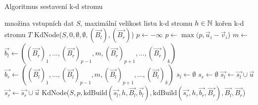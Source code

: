 \begin{algorithm}[ht!]
  \caption{Algoritmus sestavení k-d stromu}
  \label{algo:kd-tree-build}
  \begin{algorithmic}
    \Require množina vstupních dat $S$, maximální velikost listu k-d stromu $h \in \mathbb{N}$
    \Ensure kořen k-d stromu $T$
      \State \Return {}
    \EndProcedure
        \State \Return KdNode($S, 0, \emptyset, \emptyset, (\vec{B_l}), (\vec{B_r})$) 
      \EndIf
      \State $p \leftarrow -\infty$
         
          \State $p \leftarrow \max(p, \vec{u}_i - \vec{v}_i$)
        \EndFor
      \EndFor
      \State $m \leftarrow$ 
      \State $\vec{b_l} \leftarrow ((\vec{B_r})_1, \ldots, (\vec{B_r})_{p-1}, m, (\vec{B_r})_{p+1}, \ldots, (\vec{B_r})_k)$
      \State $\vec{b_r} \leftarrow ((\vec{B_l})_1, \ldots, (\vec{B_l})_{p-1}, m, (\vec{B_l})_{p+1}, \ldots, (\vec{B_l})_k)$
      \State $s_l \leftarrow \emptyset$
      \State $s_r \leftarrow \emptyset$
          \State $\vec{s_l} \leftarrow \vec{s_l} \cup \vec{u}$
        \Else
          \State $\vec{s_r} \leftarrow \vec{s_r} \cup \vec{u}$
        \EndIf
      \EndFor
      \State \Return KdNode($S, p, \textrm{kdBuild}(\vec{s_l}, h, \vec{B_l}, \vec{b_l}), \textrm{kdBuild}(\vec{s_r}, h, \vec{b_r}, \vec{B_r}), \vec{B_l}, \vec{B_r}$)
    \EndProcedure
  \end{algorithmic}
\end{algorithm}

